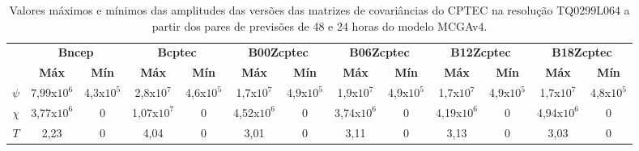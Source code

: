 \begin{table}[H]
\caption{Valores máximos e mínimos das amplitudes das versões das matrizes de covariâncias do CPTEC na resolução TQ0299L064 a partir dos pares de previsões de 48 e 24 horas do modelo MCGAv4.}
\begin{center}
\begin{adjustbox}{max width=\textwidth}
\begin{tabular}{ccccccccccccc}
\toprule
\toprule
\multicolumn{1}{c}{} & \multicolumn{2}{c}{\textbf{Bncep}} & \multicolumn{2}{c}{\textbf{Bcptec}} & \multicolumn{2}{c}{\textbf{B00Zcptec}} &\multicolumn{2}{c}{\textbf{B06Zcptec}} & \multicolumn{2}{c}{\textbf{B12Zcptec}} & \multicolumn{2}{c}{\textbf{B18Zcptec}} \\
\cmidrule(lr){2-3} \cmidrule(lr){4-5} \cmidrule(lr){6-7} \cmidrule(lr){8-9} \cmidrule(lr){10-11} \cmidrule(lr){12-13} 
\multicolumn{1}{c}{} & \multicolumn{1}{c}{\textbf{Máx}} & \multicolumn{1}{c}{\textbf{Mín}} & \multicolumn{1}{c}{\textbf{Máx}} & \multicolumn{1}{c}{\textbf{Mín}} & \multicolumn{1}{c}{\textbf{Máx}} & \multicolumn{1}{c}{\textbf{Mín}} & \multicolumn{1}{c}{\textbf{Máx}} & \multicolumn{1}{c}{\textbf{Mín}} & \multicolumn{1}{c}{\textbf{Máx}} & \multicolumn{1}{c}{\textbf{Mín}} & \multicolumn{1}{c}{\textbf{Máx}} & \multicolumn{1}{c}{\textbf{Mín}} \\
\midrule   
\multicolumn{1}{c}{$\psi$} & \multicolumn{1}{c}{7,99x$10^{6}$} & \multicolumn{1}{c}{4,3x$10^{5}$} & \multicolumn{1}{c}{2,8x$10^{7}$} & \multicolumn{1}{c}{4,6x$10^{5}$} & \multicolumn{1}{c}{1,7x$10^{7}$} & \multicolumn{1}{c}{4,9x$10^{5}$} & \multicolumn{1}{c}{1,9x$10^{7}$} & \multicolumn{1}{c}{4,9x$10^{5}$} & \multicolumn{1}{c}{1,7x$10^{7}$} & \multicolumn{1}{c}{4,9x$10^{5}$} & \multicolumn{1}{c}{1,7x$10^{7}$} & \multicolumn{1}{c}{4,8x$10^{5}$}  \\ 
\multicolumn{1}{c}{$\chi$} & \multicolumn{1}{c}{3,77x$10^{6}$} & \multicolumn{1}{c}{0} & \multicolumn{1}{c}{1,07x$10^{7}$} & \multicolumn{1}{c}{0} & \multicolumn{1}{c}{4,52x$10^{6}$} & \multicolumn{1}{c}{0} & \multicolumn{1}{c}{3,74x$10^{6}$} & \multicolumn{1}{c}{0} & \multicolumn{1}{c}{4,19x$10^{6}$} & \multicolumn{1}{c}{0} & \multicolumn{1}{c}{4,94x$10^{6}$} & \multicolumn{1}{c}{0} \\ 
\multicolumn{1}{c}{$T$}    & \multicolumn{1}{c}{2,23} & \multicolumn{1}{c}{0} & \multicolumn{1}{c}{4,04} & \multicolumn{1}{c}{0} & \multicolumn{1}{c}{3,01} & \multicolumn{1}{c}{0} & \multicolumn{1}{c}{3,11} & \multicolumn{1}{c}{0} & \multicolumn{1}{c}{3,13} & \multicolumn{1}{c}{0} & \multicolumn{1}{c}{3,03} & \multicolumn{1}{c}{0} \\ 

\end{tabular}
\end{adjustbox}
\end{center}
\end{table}
